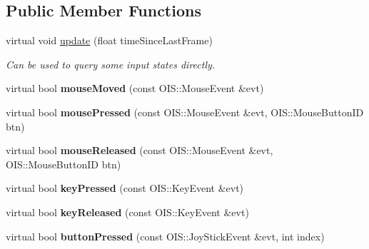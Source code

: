 \subsection*{\-Public \-Member \-Functions}
\begin{DoxyCompactItemize}
\item 
\hypertarget{classInputHandler_a6b0cfb99aca1c292c169190e21ef9ba5}{
virtual void \hyperlink{classInputHandler_a6b0cfb99aca1c292c169190e21ef9ba5}{update} (float time\-Since\-Last\-Frame)}
\label{db/df6/classInputHandler_a6b0cfb99aca1c292c169190e21ef9ba5}

\begin{DoxyCompactList}\small\item\em \-Can be used to query some input states directly. \end{DoxyCompactList}\item 
\hypertarget{classInputHandler_a2aa8947d3781d9d2b29677e1fca6c9ec}{
virtual bool {\bfseries mouse\-Moved} (const \-O\-I\-S\-::\-Mouse\-Event \&evt)}
\label{db/df6/classInputHandler_a2aa8947d3781d9d2b29677e1fca6c9ec}

\item 
\hypertarget{classInputHandler_a1a5896c6217a13b09f7e150297638814}{
virtual bool {\bfseries mouse\-Pressed} (const \-O\-I\-S\-::\-Mouse\-Event \&evt, \-O\-I\-S\-::\-Mouse\-Button\-I\-D btn)}
\label{db/df6/classInputHandler_a1a5896c6217a13b09f7e150297638814}

\item 
\hypertarget{classInputHandler_a8defb7d7fc562464d07a108eb26ce6c8}{
virtual bool {\bfseries mouse\-Released} (const \-O\-I\-S\-::\-Mouse\-Event \&evt, \-O\-I\-S\-::\-Mouse\-Button\-I\-D btn)}
\label{db/df6/classInputHandler_a8defb7d7fc562464d07a108eb26ce6c8}

\item 
\hypertarget{classInputHandler_abe493c2603deec017e4e534aea02a273}{
virtual bool {\bfseries key\-Pressed} (const \-O\-I\-S\-::\-Key\-Event \&evt)}
\label{db/df6/classInputHandler_abe493c2603deec017e4e534aea02a273}

\item 
\hypertarget{classInputHandler_a95b36c1ea88eadb897c6058c86581f4e}{
virtual bool {\bfseries key\-Released} (const \-O\-I\-S\-::\-Key\-Event \&evt)}
\label{db/df6/classInputHandler_a95b36c1ea88eadb897c6058c86581f4e}

\item 
\hypertarget{classInputHandler_a2b76007dee7f3d940d0935c25b452326}{
virtual bool {\bfseries button\-Pressed} (const \-O\-I\-S\-::\-Joy\-Stick\-Event \&evt, int index)}
\label{db/df6/classInputHandler_a2b76007dee7f3d940d0935c25b452326}


\end{DoxyCompactItemize}
